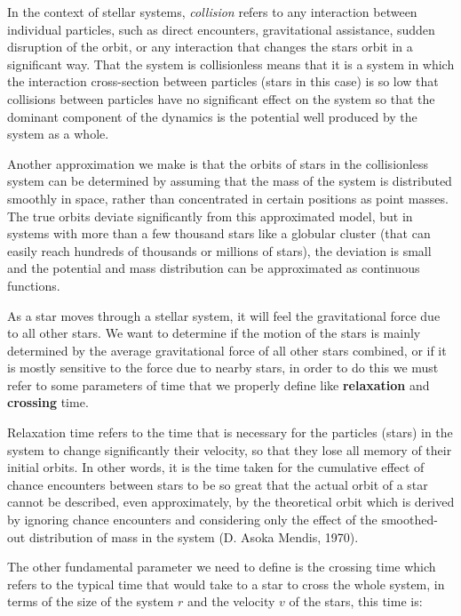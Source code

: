 In the context of stellar systems, \textit{collision} refers to any interaction between individual particles, such as direct encounters, gravitational assistance, sudden disruption of the orbit, or any interaction that changes the stars orbit in a significant way. That the system is collisionless means that it is a system in which the interaction cross-section between particles (stars in this case) is so low that collisions between particles have no significant effect on the system so that the dominant component of the dynamics is the potential well produced by the system as a whole.  

Another approximation we make is that the orbits of stars in the collisionless system can be determined by assuming that the mass of the system is distributed smoothly in space, rather than concentrated in certain positions as point masses. The true orbits deviate significantly from this approximated model, but in systems with more than a few thousand stars like a globular cluster (that can easily reach hundreds of thousands or millions of stars), the deviation is small and the potential and mass distribution can be approximated as continuous functions. 

As a star moves through a stellar system, it will feel the gravitational force due to all other stars. We want to determine if the motion of the stars is mainly determined by the average gravitational force of all other stars combined, or if it is mostly sensitive to the force due to nearby stars, in order to do this we must refer to some parameters of time that we properly define like \textbf{relaxation} and \textbf{crossing} time. 

Relaxation time refers to the time that is necessary for the particles (stars) in the system to change significantly their velocity, so that they lose all memory of their initial orbits. In other words, it is the time taken for the cumulative effect of chance encounters between stars to be so great that the actual orbit of a star cannot be described, even approximately, by the theoretical orbit which is derived by ignoring chance encounters and considering only the effect of the smoothed-out distribution of mass in the system (D. Asoka Mendis, 1970). 

The other fundamental parameter we need to define is the crossing time which refers to the typical time that would take to a star to cross the whole system, in terms of the size of the system $r$ and the velocity $v$ of the stars, this time is:


